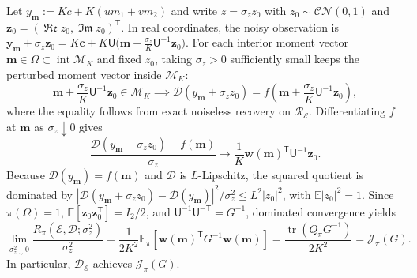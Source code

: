 \documentclass[journal,12pt,onecolumn,draftclsnofoot]{IEEEtran}
\newcommand{\enc}{\mathscr{E}}\newcommand{\dec}{\mathscr{D}}\newcommand{\R}{\mathbb R}\newcommand{\C}{\mathbb C}
\newcommand{\T}{\mathsf T}\newcommand{\suc}{\succeq}
\renewcommand{\Re}{\mathop{\mathfrak{Re}}\nolimits}
\renewcommand{\Im}{\mathop{\mathfrak{Im}}\nolimits}
\begin{document}
Let $y_{\boldsymbol m}:=Kc+K(um_1+vm_2)$ and write $z=\sigma_z z_0$ with $z_0\sim\mathcal{CN}(0,1)$ and $\boldsymbol z_0=(\Re z_0,\Im z_0)^\T$. 
In real coordinates, the noisy observation is $\boldsymbol y_{\boldsymbol m}+\sigma_z\boldsymbol z_0=K\boldsymbol c+K\mathsf U\bigl(\boldsymbol m+\frac{\sigma_z}{K}\mathsf U^{-1}\boldsymbol z_0\bigr)$. 
For each interior moment vector $\boldsymbol m\in\Omega\subset\operatorname{int}\mathcal M_K$ and fixed $z_0$, taking $\sigma_z>0$ sufficiently small keeps the perturbed moment vector inside $\mathcal M_K$:
$$
 \boldsymbol m+\frac{\sigma_z}{K}\mathsf U^{-1}\boldsymbol z_0
 \in\mathcal M_K
 \implies
 \dec(y_{\boldsymbol m}+\sigma_z z_0)
 =f\!\left(\boldsymbol m+
 \frac{\sigma_z}{K}\mathsf U^{-1}\boldsymbol z_0\right),
$$
where the equality follows from exact noiseless recovery on $\mathcal R_\enc$. Differentiating $f$ at $\boldsymbol m$ as $\sigma_z\downarrow0$ gives
$$
 \frac{\dec(y_{\boldsymbol m}+\sigma_z z_0)-f(\boldsymbol m)}
 {\sigma_z}
 \longrightarrow
 \frac{1}{K}\boldsymbol w(\boldsymbol m)^\T
 \mathsf U^{-1}\boldsymbol z_0.
$$
Because $\dec(y_{\boldsymbol m})=f(\boldsymbol m)$ and $\dec$ is $L$-Lipschitz, the squared quotient is dominated by $|\dec(y_{\boldsymbol m}+\sigma_z z_0)-\dec(y_{\boldsymbol m})|^2/\sigma_z^2\le L^2|z_0|^2$, with $\mathbb E|z_0|^2=1$. 
Since $\pi(\Omega)=1$, $\mathbb E[\boldsymbol z_0\boldsymbol z_0^\T]=I_2/2$, and $\mathsf U^{-1}\mathsf U^{-\T}=G^{-1}$, dominated convergence yields
$$
 \lim_{\sigma_z^2\downarrow0}
 \frac{R_\pi(\enc,\dec;\sigma_z^2)}{\sigma_z^2}
 =\frac{1}{2K^2}\mathbb E_\pi\!\left[\boldsymbol w(\boldsymbol m)^\T G^{-1}\boldsymbol w(\boldsymbol m)\right]
 =\frac{\operatorname{tr}(Q_\pi G^{-1})}{2K^2}
 =\mathcal J_\pi(G).
$$
In particular, $\dec_\enc$ achieves $\mathcal J_\pi(G)$.
\end{document}
